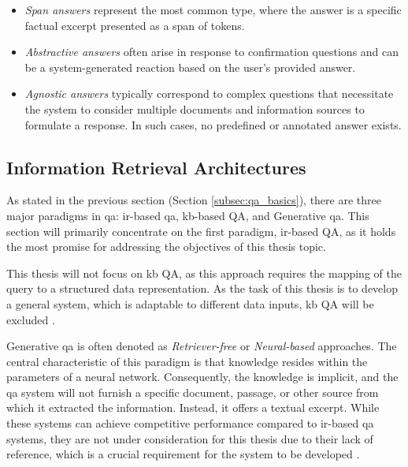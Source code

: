 \begin{itemize}
   \item \textit{Span answers} represent the most common type, where the answer is a specific factual excerpt presented as a span of tokens.
   
   \item \textit{Abstractive answers} often arise in response to confirmation questions and can be a system-generated reaction based on the user's provided answer.
   
   \item \textit{Agnostic answers} typically correspond to complex questions that necessitate the system to consider multiple documents and information sources to formulate a response. In such cases, no predefined or annotated answer exists.
\end{itemize}


\subsection{Information Retrieval Architectures}
\label{subsec:qa_architectures}

As stated in the previous section (Section \ref{subsec:qa_basics}), there are three major paradigms in \gls{qa}: \gls{ir}-based \gls{qa}, \gls{kb}-based QA, and Generative \gls{qa}. This section will primarily concentrate on the first paradigm, \gls{ir}-based QA, as it holds the most promise for addressing the objectives of this thesis topic.

This thesis will not focus on \gls{kb} QA, as this approach requires the mapping of the query to a structured data representation. As the task of this thesis is to develop a general system, which is adaptable to different data inputs, \gls{kb} QA will be excluded \cite{dimitrakis_survey_2020}.

Generative \gls{qa} is often denoted as \textit{Retriever-free} or \textit{Neural-based} approaches. The central characteristic of this paradigm is that knowledge resides within the parameters of a neural network. Consequently, the knowledge is implicit, and the \gls{qa} system will not furnish a specific document, passage, or other source from which it extracted the information. Instead, it offers a textual excerpt. While these systems can achieve competitive performance compared to \gls{ir}-based \gls{qa} systems, they are not under consideration for this thesis due to their lack of reference, which is a crucial requirement for the system to be developed \cite{roberts_how_2020}.


